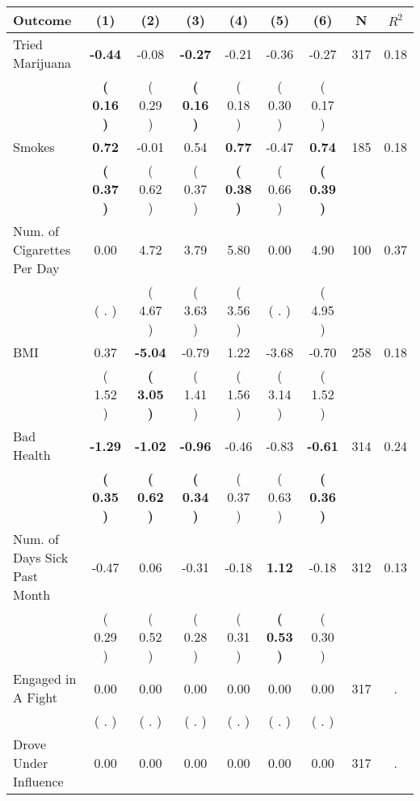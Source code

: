 \begin{tabular}{lcccccccc}
\toprule
 \textbf{Outcome} & \textbf{(1)} & \textbf{(2)} & \textbf{(3)} & \textbf{(4)} & \textbf{(5)} & \textbf{(6)} & \textbf{N} & \textbf{$ R^2$} \\
\midrule
Tried Marijuana & \textbf{    -0.44} &     -0.08 & \textbf{    -0.27} &     -0.21 &     -0.36 &     -0.27 & 317 &       0.18 \\ 
 & \textbf{(     0.16 )} & (     0.29 ) & \textbf{(     0.16 )} & (     0.18 ) & (     0.30 ) & (     0.17 ) & \\
Smokes & \textbf{     0.72} &     -0.01 &      0.54 & \textbf{     0.77} &     -0.47 & \textbf{     0.74} & 185 &       0.18 \\ 
 & \textbf{(     0.37 )} & (     0.62 ) & (     0.37 ) & \textbf{(     0.38 )} & (     0.66 ) & \textbf{(     0.39 )} & \\
Num. of Cigarettes Per Day &      0.00 &      4.72 &      3.79 &      5.80 &      0.00 &      4.90 & 100 &       0.37 \\ 
 & (        . ) & (     4.67 ) & (     3.63 ) & (     3.56 ) & (        . ) & (     4.95 ) & \\
BMI &      0.37 & \textbf{    -5.04} &     -0.79 &      1.22 &     -3.68 &     -0.70 & 258 &       0.18 \\ 
 & (     1.52 ) & \textbf{(     3.05 )} & (     1.41 ) & (     1.56 ) & (     3.14 ) & (     1.52 ) & \\
Bad Health & \textbf{    -1.29} & \textbf{    -1.02} & \textbf{    -0.96} &     -0.46 &     -0.83 & \textbf{    -0.61} & 314 &       0.24 \\ 
 & \textbf{(     0.35 )} & \textbf{(     0.62 )} & \textbf{(     0.34 )} & (     0.37 ) & (     0.63 ) & \textbf{(     0.36 )} & \\
Num. of Days Sick Past Month &     -0.47 &      0.06 &     -0.31 &     -0.18 & \textbf{     1.12} &     -0.18 & 312 &       0.13 \\ 
 & (     0.29 ) & (     0.52 ) & (     0.28 ) & (     0.31 ) & \textbf{(     0.53 )} & (     0.30 ) & \\
Engaged in A Fight &      0.00 &      0.00 &      0.00 &      0.00 &      0.00 &      0.00 & 317 &          . \\ 
 & (        . ) & (        . ) & (        . ) & (        . ) & (        . ) & (        . ) & \\
Drove Under Influence &      0.00 &      0.00 &      0.00 &      0.00 &      0.00 &      0.00 & 317 &          . \\ 

\end{tabular}
